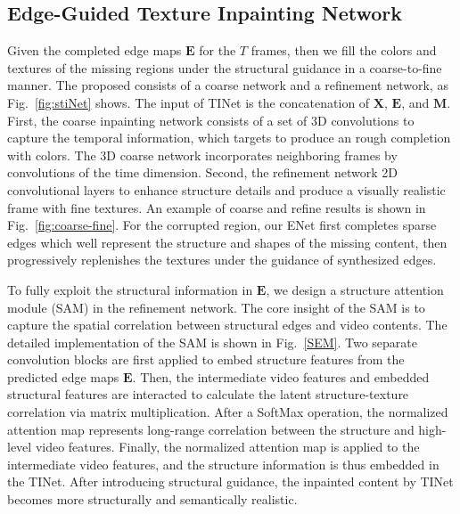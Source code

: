 \subsection{Edge-Guided Texture Inpainting Network}


Given the completed edge maps $\boldsymbol{E}$ for the 
$T$ frames, then we fill the colors and textures of the missing regions under the structural guidance in a coarse-to-fine manner. 
%
The proposed  consists of a coarse network and a refinement network, as Fig.~\ref{fig:stiNet} shows.
%
The input of TINet is the concatenation of $\boldsymbol{X}$, $\boldsymbol{E}$, and $\boldsymbol{M}$.
First, the coarse inpainting network consists of a set of 3D convolutions to capture the temporal information, which targets to produce an rough completion  with colors.
The 3D coarse network incorporates neighboring frames by convolutions of the time dimension.
%
Second, the refinement network  2D convolutional layers to enhance structure details and produce a visually realistic frame with fine textures. 
An example of coarse and refine results is shown in Fig.~\ref{fig:coarse-fine}. 
For the corrupted region, our ENet first completes sparse edges which well represent the structure and shapes of the missing content, then progressively replenishes the textures under the guidance of synthesized edges.



To fully exploit the structural information in $\boldsymbol{E}$, we design a structure attention module (SAM) in the refinement network.
The core insight of the SAM is to capture the spatial correlation between structural edges and video contents.
The detailed implementation of the SAM is shown in Fig.~\ref{SEM}.
Two separate convolution blocks are first applied to embed structure features from the predicted edge maps $\boldsymbol{E}$.
Then, the intermediate video features and embedded structural features are interacted to calculate the latent structure-texture correlation via matrix multiplication. 
After a SoftMax operation, the normalized attention map represents long-range correlation between the structure and high-level video features.
%
Finally, the normalized attention map is applied to the intermediate video features, and the structure information is thus embedded in the TINet.
After introducing structural guidance, the inpainted content by TINet becomes more structurally and semantically realistic.
 


